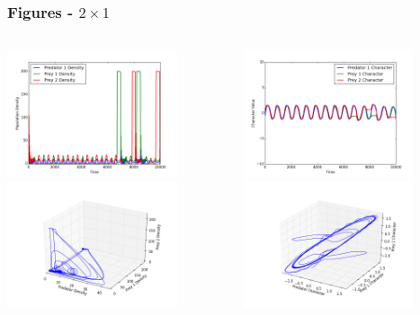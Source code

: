 \documentclass[10pt]{beamer}
\begin{document}
\begin{frame}
	\frametitle{Figures - $2\times1$}
	\begin{columns}[t]
		\begin{column}{.5\textwidth}
			\centering
			\includegraphics[width=5cm,height=3.75cm]{figures/1x2/variable_growth/densities_random_domination.png}\\
			\includegraphics[width=5cm,height=3.75cm]{figures/1x2/variable_growth/density_phase_plane_random_domination.png}
		\end{column}
		\begin{column}{.5\textwidth}
			\centering
			\includegraphics[width=5cm,height=3.75cm]{figures/1x2/variable_growth/traits_random_domination.png}\\
			\includegraphics[width=5cm,height=3.75cm]{figures/1x2/variable_growth/trait_phase_plane_random_domination.png}
		\end{column}
	\end{columns}
\end{frame}
\end{document}

